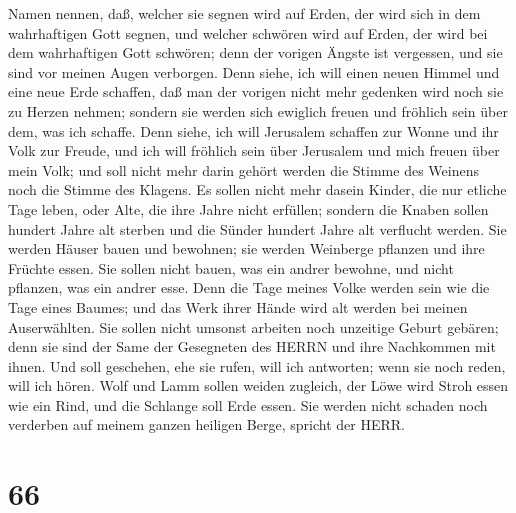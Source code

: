 Namen nennen,  daß, welcher sie segnen wird auf Erden, der
wird sich in dem wahrhaftigen Gott segnen, und welcher schwören wird auf
Erden, der wird bei dem wahrhaftigen Gott schwören; denn der vorigen
Ängste ist vergessen, und sie sind vor meinen Augen verborgen.
 Denn siehe, ich will einen neuen Himmel und eine neue Erde
schaffen, daß man der vorigen nicht mehr gedenken wird noch sie zu
Herzen nehmen;  sondern sie werden sich ewiglich freuen und
fröhlich sein über dem, was ich schaffe. Denn siehe, ich will Jerusalem
schaffen zur Wonne und ihr Volk zur Freude,  und ich will
fröhlich sein über Jerusalem und mich freuen über mein Volk; und soll
nicht mehr darin gehört werden die Stimme des Weinens noch die Stimme
des Klagens.  Es sollen nicht mehr dasein Kinder, die nur
etliche Tage leben, oder Alte, die ihre Jahre nicht erfüllen; sondern
die Knaben sollen hundert Jahre alt sterben und die Sünder hundert Jahre
alt verflucht werden.  Sie werden Häuser bauen und
bewohnen; sie werden Weinberge pflanzen und ihre Früchte essen.
 Sie sollen nicht bauen, was ein andrer bewohne, und nicht
pflanzen, was ein andrer esse. Denn die Tage meines Volke werden sein
wie die Tage eines Baumes; und das Werk ihrer Hände wird alt werden bei
meinen Auserwählten.  Sie sollen nicht umsonst arbeiten
noch unzeitige Geburt gebären; denn sie sind der Same der Gesegneten des
HERRN und ihre Nachkommen mit ihnen.  Und soll geschehen,
ehe sie rufen, will ich antworten; wenn sie noch reden, will ich hören.
 Wolf und Lamm sollen weiden zugleich, der Löwe wird Stroh
essen wie ein Rind, und die Schlange soll Erde essen. Sie werden nicht
schaden noch verderben auf meinem ganzen heiligen Berge, spricht der
HERR.

\hypertarget{section-65}{%
\section{66}\label{section-65}}

